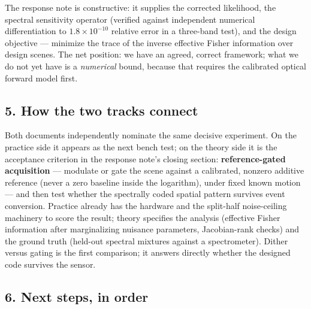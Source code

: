 \documentclass[11pt,a4paper]{article}
\newcommand{\heading}[1]{\subsection*{\color{reportblue}#1}}
\begin{document}
The response note is constructive: it supplies the corrected likelihood, the spectral
sensitivity operator (verified against independent numerical differentiation to
$1.8 \times 10^{-10}$ relative error in a three-band test), and the design objective
--- minimize the trace of the inverse effective Fisher information over design
scenes. The net position: we have an agreed, correct framework; what we do not yet
have is a \emph{numerical} bound, because that requires the calibrated optical
forward model first.

\heading{5. How the two tracks connect}

Both documents independently nominate the same decisive experiment. On the practice
side it appears as the next bench test; on the theory side it is the acceptance
criterion in the response note's closing section: \textbf{reference-gated
acquisition} --- modulate or gate the scene against a calibrated, nonzero additive
reference (never a zero baseline inside the logarithm), under fixed known motion ---
and then test whether the spectrally coded spatial pattern survives event conversion.
Practice already has the hardware and the split-half noise-ceiling machinery to
score the result; theory specifies the analysis (effective Fisher information after
marginalizing nuisance parameters, Jacobian-rank checks) and the ground truth
(held-out spectral mixtures against a spectrometer). Dither versus gating is the
first comparison; it answers directly whether the designed code survives the sensor.

\begin{center}
\end{center}

\heading{6. Next steps, in order}
\end{document}

